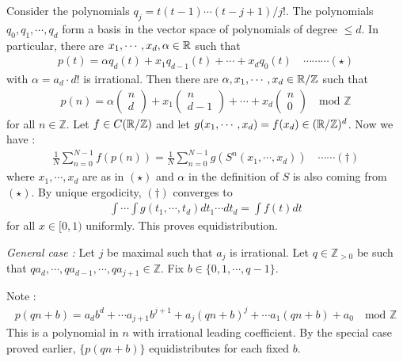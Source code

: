 \documentclass[12pt,a4paper]{report}
\newenvironment{proof}
{\begin{changemargin}{1cm}{0.5cm} 
	}%
	{\end{changemargin}
}
\begin{document}
\begin{proof}
\quad Consider the polynomials $q_j = t(t-1)\cdots (t-j+1)/j !$. The polynomials $q_0,q_1,\cdots,q_d$ form a basis in the vector space of polynomials of degree $\leq d$. In particular, there are $x_1, \cdots,x_d,\alpha \in \mathbb{R}$ such that
\begin{align*}
p(t) = \alpha q_d (t) + x_1 q_{d-1}(t) + \cdots + x_d q_0(t) \quad \cdots\cdots\cdots (\star)
\end{align*}
with $\alpha = a_d \cdot d!$ is irrational. Then there are $\alpha, x_1, \cdots,x_d \in \mathbb{R}/\mathbb{Z}$ such that
\begin{align*}
p(n) = \alpha\begin{pmatrix}
n \\
d
\end{pmatrix} + x_1 \begin{pmatrix}
n \\
d-1
\end{pmatrix} + \cdots + x_d \begin{pmatrix}
n \\
0
\end{pmatrix} \quad \text{mod } \mathbb{Z}
\end{align*}
for all $n\in \mathbb{Z}$. Let $f\in C(\mathbb{R}/\mathbb{Z})$ and let $g(x_1, \cdots, x_d) = f(x_d) \in (\mathbb{R}/\mathbb{Z})^d$. Now we have :
\begin{align*}
\frac{1}{N} \sum_{n=0}^{N-1} f(p(n)) = \frac{1}{N} \sum_{n=0}^{N-1} g(S^n(x_1, \cdots, x_d)) \quad \cdots \cdots (\dagger)
\end{align*}
where $x_1,\cdots, x_d$ are as in $(\star)$ and $\alpha$ in the definition of $S$ is also coming from $(\star)$. By unique ergodicity, $(\dagger)$ converges to
\begin{align*}
\int \cdots \int g(t_1, \cdots, t_d) dt_1 \cdots dt_d = \int f(t)dt 
\end{align*}
for all $x \in [0,1)$ uniformly. This proves equidistribution.
\s

\textit{General case :} Let $j$ be maximal such that $a_j$ is irrational. Let $q\in \mathbb{Z}_{>0}$ be such that $qa_d, \cdots,qa_{d-1},\cdots, qa_{j+1} \in \mathbb{Z}$. Fix $b \in \{ 0,1,\cdots,q-1 \}$.

\quad Note :
\begin{align*}
p(qn+b) = a_d b^d + \cdots a_{j+1} b^{j+1} + a_j(qn +b)^j + \cdots  a_1(qn+b) + a_0 \quad \text{mod } \mathbb{Z}
\end{align*}
This is a polynomial in $n$ with irrational leading coefficient. By the special case proved earlier, $\{ p(qn + b) \}$ equidistributes for each fixed $b$.

\eop
\end{proof}
\s
\end{document}
